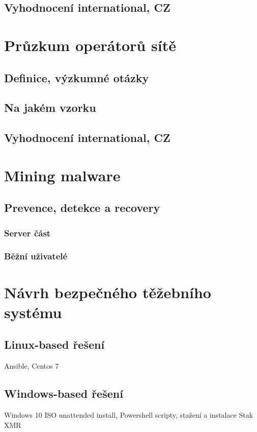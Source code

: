 \documentclass[
  printed, %
  table,   %
  nolof,     %
  nolot,     %
           oneside, color
]{fithesis3}
\begin{document}
\section{Vyhodnocení international, CZ}



\chapter{Průzkum operátorů sítě}
\section{Definice, výzkumné otázky}
\section{Na jakém vzorku}
\section{Vyhodnocení international, CZ}

 
\chapter{Mining malware}
\section{Prevence, detekce a recovery}
\subsection{Server část}
\subsection{Běžní uživatelé}


\chapter{Návrh bezpečného těžebního systému}
\section{Linux-based řešení}
Ansible, Centos 7
\section{Windows-based řešení}
Windows 10 ISO unattended install, Powershell scripty, stažení a instalace Stak XMR
\end{document}
